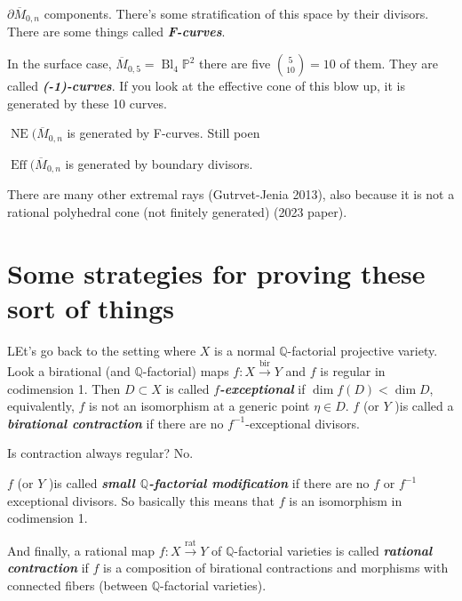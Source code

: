 $\partial\overline{M}_{0,n}$ components. There's some stratification of this space by their divisors. There are some things called \textit{\textbf{F-curves}}.

 \begin{example}
	 In the surface case, $\overline{M}_{0,5}=\operatorname{Bl}_{4}\mathbb{P}^2$ there are five $\binom{5}{10}=10$ of them. They are called \textit{\textbf{(-1)-curves}}. If you look at the effective cone of this blow up, it is generated by these 10 curves.
\end{example}

\begin{conjecture}
	$\operatorname{NE}(\overline{M}_{0,n}$ is generated by F-curves. Still poen
\end{conjecture}

\begin{conjecture}
$\operatorname{E f f}(\overline{M}_{0,n}$	is generated by boundary divisors.
\end{conjecture}
There are many other extremal rays (Gutrvet-Jenia 2013), also because it is not a rational polyhedral cone (not finitely generated) (2023 paper).

\section{Some strategies for proving these sort of things}

LEt's go back to the setting where $X$ is a normal $\mathbb{Q}$-factorial projective variety. Look a birational (and $\mathbb{Q}$-factorial) maps $f:X\overset{\operatorname{bir}}{\longrightarrow}Y$ and $f$ is regular in codimension 1. Then $D\subset X$ is called \textit{\textbf{$f$-exceptional}}  if $\dim f(D)<\dim D$, equivalently, $f$ is not an isomorphism at a generic point $\eta\in D$. $f$ (or $Y$ )is called a \textit{\textbf{birational contraction}} if there are no  $f^{-1}$-exceptional divisors.

\begin{question}[Misha]
	Is contraction always regular? No.
\end{question}

$f$ (or $Y$ )is called \textit{\textbf{small $\mathbb{Q}$-factorial modification}} if there are no $f$ or $f^{-1}$ exceptional divisors. So basically this means that $f$ is an isomorphism in codimension 1.

And finally, a rational map $f:X\overset{\operatorname{rat}}{\longrightarrow} Y$ of $\mathbb{Q}$-factorial varieties is called \textit{\textbf{rational contraction}} if $f$ is a composition of birational contractions and morphisms with connected fibers (between $\mathbb{Q}$-factorial varieties).

